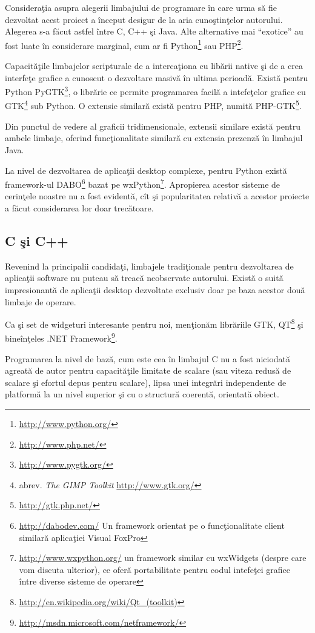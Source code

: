Consideraţia asupra alegerii limbajului de programare în care urma să fie 
dezvoltat acest proiect a început desigur de la aria cunoştinţelor autorului. 
Alegerea s-a făcut astfel între C, C++ şi Java. Alte alternative mai 
``exotice'' au fost luate în considerare marginal, cum ar fi 
Python\footnote{\url{http://www.python.org/}} sau 
PHP\footnote{\url{http://www.php.net/}}.

Capacităţile limbajelor scripturale de a intercaţiona cu libării native şi de a 
crea interfeţe grafice a cunoscut o dezvoltare masivă în ultima perioadă. 
Există pentru Python PyGTK\footnote{\url{http://www.pygtk.org/}}, o librărie ce 
permite programarea facilă a intefeţelor grafice cu GTK\footnote{abrev. 
\textit{The GIMP Toolkit} \url{http://www.gtk.org/}} sub Python. O extensie 
similară există pentru PHP, numită PHP-GTK\footnote{\url{http://gtk.php.net/}}.

Din punctul de vedere al graficii tridimensionale, extensii similare există 
pentru ambele limbaje, oferind funcţionalitate similară cu extensia prezenză în 
limbajul Java.

La nivel de dezvoltarea de aplicaţii desktop complexe, pentru Python există 
framework-ul DABO\footnote{\url{http://dabodev.com/} Un framework orientat pe o 
funcţionalitate client similară aplicaţiei Visual FoxPro} bazat pe 
wxPython\footnote{\url{http://www.wxpython.org/} un framework similar cu 
wxWidgets (despre care vom discuta ulterior), ce oferă portabilitate pentru 
codul intefeţei grafice între diverse sisteme de operare}. Apropierea acestor 
sisteme de cerinţele noastre nu a fost evidentă, cît şi popularitatea relativă 
a acestor proiecte a făcut considerarea lor doar trecătoare.

\subsection{C şi C++}

Revenind la principalii candidaţi, limbajele tradiţionale pentru dezvoltarea de 
aplicaţii software nu puteau să treacă neobservate autorului. Există o suită 
impresionantă de aplicaţii desktop dezvoltate exclusiv doar pe baza acestor 
două limbaje de operare.

Ca şi set de widgeturi interesante pentru noi, menţionăm librăriile GTK, 
QT\footnote{\url{http://en.wikipedia.org/wiki/Qt_(toolkit)}} şi bineînţeles 
.NET Framework\footnote{\url{http://msdn.microsoft.com/netframework/}}.

Programarea la nivel de bază, cum este cea în limbajul C nu a fost niciodată 
agreată de autor pentru capacităţile limitate de scalare (sau viteza redusă de 
scalare şi efortul depus pentru scalare), lipsa unei integrări independente de 
platformă la un nivel superior şi cu o structură coerentă, orientată obiect.

